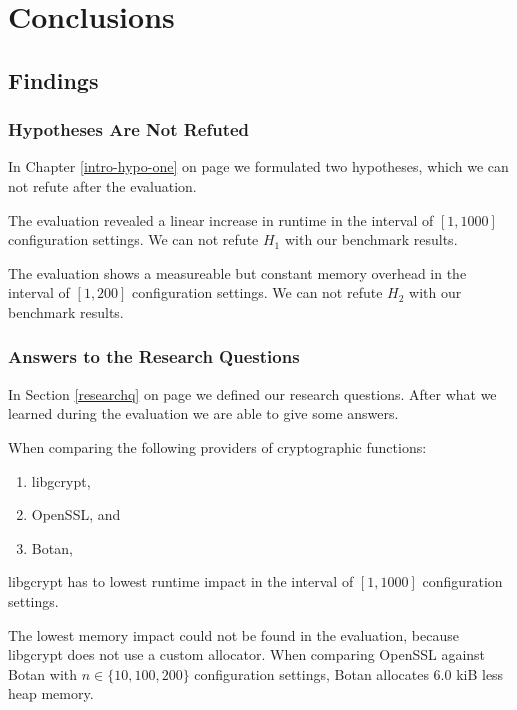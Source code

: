 \chapter{Conclusions}

\section{Findings}

	\subsection{Hypotheses Are Not Refuted}

In Chapter \ref{intro-hypo-one} on page \pageref{intro-hypo-one} we formulated two hypotheses, which we can not refute after the evaluation.


The evaluation revealed a linear increase in runtime in the interval of $[1,1000]$ configuration settings.
We can not refute $H_1$ with our benchmark results.


The evaluation shows a measureable but constant memory overhead in the interval of $[1,200]$ configuration settings.
We can not refute $H_2$ with our benchmark results.

	\subsection{Answers to the Research Questions}

In Section \ref{researchq} on page \pageref{researchq} we defined our research questions.
After what we learned during the evaluation we are able to give some answers.


When comparing the following providers of cryptographic functions:
\begin{enumerate}
\item libgcrypt,
\item OpenSSL, and
\item Botan,
\end{enumerate}

libgcrypt has to lowest runtime impact in the interval of $[1,1000]$ configuration settings.

The lowest memory impact could not be found in the evaluation, because libgcrypt does not use a custom allocator.
When comparing OpenSSL against Botan with $n \in \{10,100,200\}$ configuration settings, Botan allocates 6.0 kiB less heap memory.

